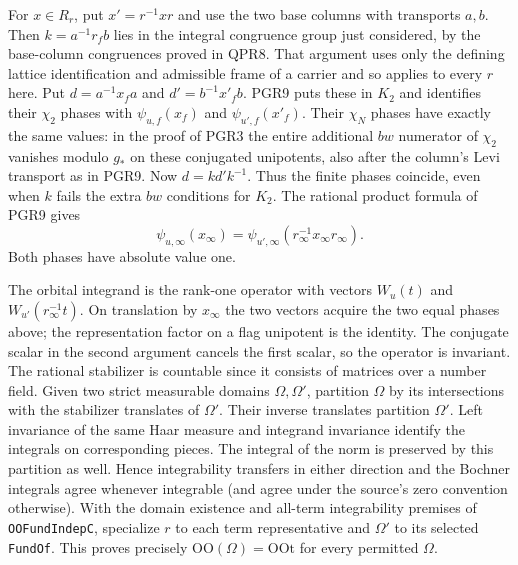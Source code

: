 For $x\in R_r$, put $x'=r^{-1}xr$ and use the two base columns with
transports $a,b$. Then $k=a^{-1}r_f b$ lies in the integral
congruence group just considered, by the base-column congruences
proved in QPR8. That argument uses only the defining lattice
identification and admissible frame of a carrier and so applies to
every $r$ here. Put $d=a^{-1}x_f a$ and $d'=b^{-1}x'_f b$.
PGR9 puts these in $K_2$ and identifies their $\chi_2$ phases with
$\psi_{u,f}(x_f)$ and $\psi_{u',f}(x'_f)$. Their $\chi_N$ phases
have exactly the same values: in the proof of PGR3 the entire
additional $bw$ numerator of $\chi_2$ vanishes modulo $g_*$ on
these conjugated unipotents, also after the column's Levi transport
as in PGR9. Now $d=kd'k^{-1}$. Thus the finite phases coincide,
even when $k$ fails the extra $bw$ conditions for $K_2$.
The rational product formula of PGR9 gives
\[
        \psi_{u,\infty}(x_\infty)
        =\psi_{u',\infty}(r_\infty^{-1}x_\infty r_\infty).
\]
Both phases have absolute value one.

The orbital integrand is the rank-one operator with vectors
$W_u(t)$ and $W_{u'}(r_\infty^{-1}t)$. On translation by
$x_\infty$ the two vectors acquire the two equal phases above;
the representation factor on a flag unipotent is the identity.
The conjugate scalar in the second argument cancels the first scalar,
so the operator is invariant. The rational stabilizer is countable
since it consists of matrices over a number field. Given two strict
measurable domains $\Omega,\Omega'$, partition $\Omega$ by its
intersections with the stabilizer translates of $\Omega'$. Their
inverse translates partition $\Omega'$. Left invariance of the same
Haar measure and integrand invariance identify the integrals on
corresponding pieces. The integral of the norm is preserved by
this partition as well. Hence integrability transfers in either
direction and the Bochner integrals agree whenever integrable
(and agree under the source's zero convention otherwise). With
the domain existence and all-term integrability premises of
\texttt{OOFundIndepC}, specialize $r$ to each term representative
and $\Omega'$ to its selected \texttt{FundOf}. This proves precisely
$\mathrm{OO}(\Omega)=\mathrm{OOt}$ for every permitted $\Omega$.

